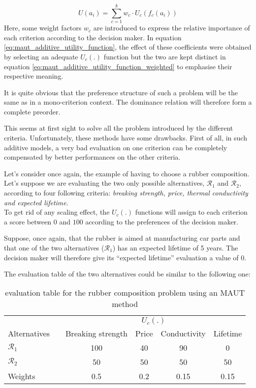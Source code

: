 \begin{equation}
    U(a_i) = \sum\limits^k_{c=1} w_c \cdot U_c(f_c(a_i))
    \label{eq:maut_additive_utility_function_weighted}
\end{equation}
Here, some weight factors $w_c$ are introduced to express the relative importance of each criterion according to the decision maker.
In equation \ref{eq:maut_additive_utility_function}, the effect of these coefficients were obtained by selecting an adequate $U_c(.)$ function but the two are kept distinct in equation \ref{eq:maut_additive_utility_function_weighted} to emphasise their respective meaning.

It is quite obvious that the preference structure of such a problem will be the same as in a mono-criterion context. The dominance relation will therefore form a complete preorder.

This seems at first sight to solve all the problem introduced by the different criteria. Unfortunately, these methods have some drawbacks. First of all, in such additive models, a very bad evaluation on one criterion can be completely compensated by better performances on the other criteria.

Let's consider once again, the example of having to choose a rubber composition. Let's suppose we are evaluating the two only possible alternatives, $\mathcal{R}_1$ and $\mathcal{R}_2$, according to four following criteria: \textit{breaking strength, price, thermal conductivity and expected lifetime}. \\
To get rid of any scaling effect, the $U_c(.)$ functions will assign to each criterion a score between $0$ and $100$ according to the preferences of the decision maker.

Suppose, once again, that the rubber is aimed at manufacturing car parts and that one of the two alternatives ($\mathcal{R}_1$) has an expected lifetime of 5 years. The decision maker will therefore give its ``expected lifetime'' evaluation a value of 0.

The evaluation table of the two alternatives could be similar to the following one:
\begin{table}[h]
\center
\begin{tabular}{ l c c c c c}
    \toprule
     &  &  \multicolumn{4}{c}{$U_c(.)$} \\
     \cmidrule{3-6}
     Alternatives & & Breaking strength & Price & Conductivity & Lifetime  \\
     \cmidrule(rl){1-1}   \cmidrule{3-6}
      $\mathcal{R}_1$  & & 100      & 40    & 90      & 0   \\
      $\mathcal{R}_2$  & &50       & 50    & 50      & 50  \\
    \cmidrule(lr){1-6}
    Weights   & &0.5      & 0.2   & 0.15    & 0.15 \\
    \bottomrule
\end{tabular}
\caption{evaluation table for the rubber composition problem using an MAUT method}
\label{tbl:maut_compensation_bad_criterion}
\end{table}

